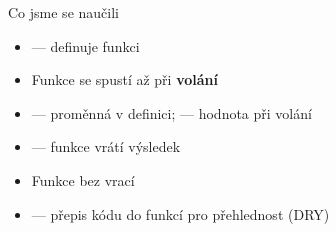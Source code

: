 \begin{frame}{Co jsme se naučili}
  \begin{itemize}
    \item[\checkmark]  — definuje funkci
    \item[\checkmark] Funkce se spustí až při \textbf{volání} 
    \item[\checkmark]  — proměnná v definici;  — hodnota při volání
    \item[\checkmark]  — funkce vrátí výsledek
    \item[\checkmark] Funkce bez  vrací 
    \item[\checkmark]  — přepis kódu do funkcí pro přehlednost (DRY)
  \end{itemize}
\end{frame}


